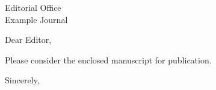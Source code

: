 \documentclass[11pt]{letter}
\date{9 October 2026}
\begin{document}
\begin{letter}{Editorial Office\\Example Journal}
\opening{Dear Editor,}
Please consider the enclosed manuscript for publication.
\closing{Sincerely,}
\end{letter}
\end{document}
